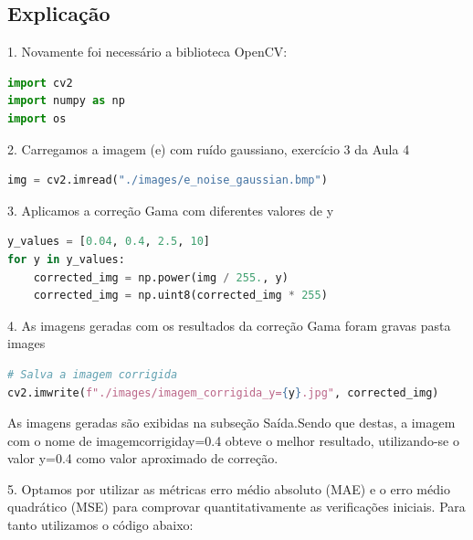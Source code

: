 \documentclass[10pt,a4paper]{article}
\begin{document}
\subsection{Explicação}

\begin{flushleft}
1. Novamente foi necessário a biblioteca OpenCV:
\end{flushleft}

\begin{lstlisting}[language=Python]
import cv2
import numpy as np
import os
\end{lstlisting}

\begin{flushleft}
2.	Carregamos a imagem (e) com ruído gaussiano, exercício 3 da Aula 4
\end{flushleft}

\begin{lstlisting}[language=Python]
img = cv2.imread("./images/e_noise_gaussian.bmp")
\end{lstlisting}

\begin{flushleft}
3.	Aplicamos a correção Gama com diferentes valores de y
\end{flushleft}

\begin{lstlisting}[language=Python]
y_values = [0.04, 0.4, 2.5, 10]
for y in y_values:
    corrected_img = np.power(img / 255., y)
    corrected_img = np.uint8(corrected_img * 255)
\end{lstlisting}

\begin{flushleft}
4.	As imagens geradas com os resultados da correção Gama foram gravas pasta images
\end{flushleft}

\begin{lstlisting}[language=Python]
# Salva a imagem corrigida
cv2.imwrite(f"./images/imagem_corrigida_y={y}.jpg", corrected_img)   
\end{lstlisting}

\begin{flushleft}
As imagens geradas são exibidas na subseção Saída.Sendo que destas, a imagem com o nome de imagem\textunderscore corrigida\textunderscore y=0.4 obteve o melhor resultado,  utilizando-se  o valor y=0.4 como valor aproximado de correção.
\end{flushleft}

\begin{flushleft}
5. Optamos por utilizar as métricas erro médio absoluto (MAE) e o erro médio quadrático (MSE) para comprovar quantitativamente as verificações iniciais. Para tanto utilizamos o código abaixo:
\end{flushleft}
\end{document}
